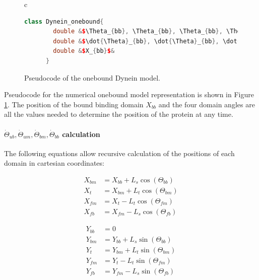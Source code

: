 \documentclass[10pt]{article} %
\begin{document}
\begin{figure}[h]
  \centering
  \begin{tabular}{c}
    \begin{lstlisting}[language=C++]
      class Dynein_onebound{
        double &$\Theta_{bb}, \Theta_{bb}, \Theta_{bb}, \Theta_{bb}$&
        double &$\dot{\Theta}_{bb}, \dot{\Theta}_{bb}, \dot{\Theta}_{bb}, \dot{\Theta}_{bb}$&
        double &$X_{bb}$&
      }
    \end{lstlisting}
  \end{tabular}
  \caption{Pseudocode of the onebound Dynein model.}
  \label{ob_struct}
\end{figure}

Pseudocode for the numerical onebound model representation is shown in Figure \ref{ob_struct}. The position of the bound binding domain $X_{bb}$ and the four domain angles are all the values needed to determine the position of the protein at any time.\\

\paragraph{$\dot{\Theta}_{ub}, \dot{\Theta}_{um}, \dot{\Theta}_{bm}, \dot{\Theta}_{bb}$ calculation}

The following equations allow recursive calculation of the positions of each domain in cartesian coordinates:

\noindent\begin{minipage}{0.49\linewidth}
\begin{align}
  X_{bm} &= X_{bb}+L_{s}\cos(\Theta_{bb}) \\
  X_{t}  &= X_{bm}+L_{t}\cos(\Theta_{bm}) \\
  X_{fm} &= X_{t} - L_{t}\cos(\Theta_{fm}) \\
  X_{fb} &= X_{fm} - L_{s}\cos(\Theta_{fb})
\end{align}
\end{minipage}
\begin{minipage}{0.49\linewidth}
\begin{align}
  Y_{bb} &= 0 \\
  Y_{bm} &= Y_{bb}+L_{s}\sin(\Theta_{bb}) \\
  Y_{t}  &= Y_{bm}+L_{t}\sin(\Theta_{bm}) \\
  Y_{fm} &= Y_{t} - L_{t}\sin(\Theta_{fm}) \\
  Y_{fb} &= Y_{fm} - L_{s}\sin(\Theta_{fb})
\end{align}
\end{minipage}
\vspace{.5cm}
\end{document}

